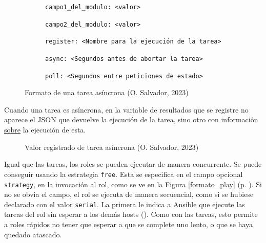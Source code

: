 \documentclass[11pt]{article}
\begin{document}
\begin{flushleft}
\begin{figure}[htb]
\begin{subfigure}{0.6\textwidth}
                \hspace{5mm}
                \texttt{campo1\_del\_modulo: <valor>}
            
                \hspace{5mm}
                \texttt{campo2\_del\_modulo: <valor>}
        
            \hspace{2.2mm}
            \texttt{register: <Nombre para la ejecución de la tarea>}    

            \hspace{2.2mm}
            \texttt{async: <Segundos antes de abortar la tarea>}    

            \hspace{2.2mm}
            \texttt{poll: <Segundos entre peticiones de estado>}    
        \end{subfigure}
        \caption{Formato de una tarea asíncrona (O. Salvador, 2023)}
    \end{figure}

    Cuando una tarea es asíncrona, en la variable de resultados que se registre no aparece el JSON que devuelve la ejecución de la tarea, sino otro con información \underline{sobre} la ejecución de esta. 
    \linebreak
    
        \begin{figure}[htb]
			\centering
			\caption{Valor registrado de tarea asíncrona (O. Salvador, 2023)}
		\end{figure}

    \clearpage
    Igual que las tareas, los roles se pueden ejecutar de manera concurrente. Se puede conseguir usando la estrategia \texttt{free}. Esta se especifica en el campo opcional \texttt{strategy}, en la invocación al rol, como se ve en la Figura \ref{formato_play} (p. \pageref{formato_play}). Si no se obvia el campo, el rol se ejecuta de manera secuencial, como si se hubiese declarado con el valor \texttt{serial}. La primera le indica a Ansible que ejecute las tareas del rol sin esperar a los demás hosts (\cite{ansible_free}). Como con las tareas, esto permite a roles rápidos no tener que esperar a que se complete uno lento, o que se haya quedado atascado.
    \linebreak


\end{flushleft}
\end{document}
